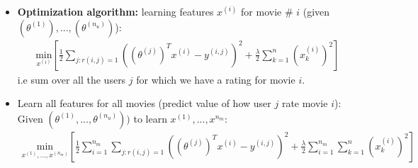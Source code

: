 \documentclass[a4paper,12pt]{report}
\begin{document}
\begin{itemize}
\item \textbf{Optimization algorithm:} learning features $x^{(i)}$ for movie \# $i$ (given $(\theta^{(1)}), ..., (\theta^{(n_u)})$):
	\begin{align}
	\underset{{x^{(i)}}}{\text{min}} \left[ \frac{1}{2} \sum _{j:r(i,j)=1} \left( (\theta^{(j)})^T x^{(i)} - y^{(i,j)}\right)^2 + \frac{\lambda}{2} \sum_{k=1} ^{n} (x_k ^{(i)})^2 \right]
	\end{align}
i.e sum over all the users $j$ for which we have a rating for movie $i$. 
\item Learn all features for all movies (predict value of how user $j$ rate movie $i$):
\\ Given $(\theta^{(1)}, ..., \theta^{(n_u)}))$ to learn $x^{(1)}, ..., x^{n_m}$:
	\begin{align}
	\underset{x^{(1)},...,x^{(n_m)}}{\text{min}} \left[ \frac{1}{2} \sum_{i=1} ^{n_m} \sum _{j:r(i,j)=1} \left( (\theta^{(j)})^T x^{(i)} - y^{(i,j)}\right)^2 + \frac{\lambda}{2} \sum _{i=1} ^{n_m} \sum_{k=1} ^{n}  (x_k ^{(i)})^2 \right]
	\end{align}
\end{itemize}
\end{document}
